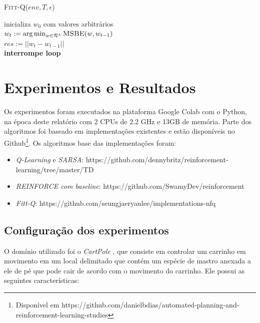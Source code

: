 \documentclass[letterpaper]{article}
\begin{document}
\linesnumbered
\dontprintsemicolon
\begin{algorithm}[t!]
{
	\caption{\textsc{Fitt-Q}($ env, T, \epsilon $)}
	\label{alg:reinforce}
    inicializa $ w_0 $ com valores arbitrários \\

    {
      $w_t := \arg \min_{w \in \mathcal{R}^k} \textsc{MSBE}(w, w_{t-1}) $ \\
      $res := || w_t - w_{t-1} ||$ \\

      {
        \textbf{interrompe loop}
      }
    }
}
\end{algorithm}

\section{Experimentos e Resultados}

Os experimentos foram executados na plataforma Google Colab com o Python, na época deste relatório com 2 CPUs de 2.2 GHz e 13GB de memória. Parte dos algoritmos foi baseado em implementações existentes e estão disponíveis no Github\footnote{Disponível em https://github.com/danielbdias/automated-planning-and-reinforcement-learning-studies}. Os algoritmos base das implementações foram:

\begin{itemize}
  \item \textit{Q-Learning} e \textit{SARSA}: https://github.com/dennybritz/reinforcement-learning/tree/master/TD
  \item \textit{REINFORCE com baseline}: https://github.com/SwamyDev/reinforcement
  \item \textit{Fitt-Q}: https://github.com/seungjaeryanlee/implementations-nfq
\end{itemize}

\subsection{Configuração dos experimentos}

O domínio utilizado foi o \textit{CartPole} \cite{SuttonBarto-2018}, que consiste em controlar um carrinho em movimento em um local delimitado que contém um espécie de mastro anexada a ele de pé que pode cair de acordo com o movimento do carrinho. Ele possui as seguintes características:
\end{document}
